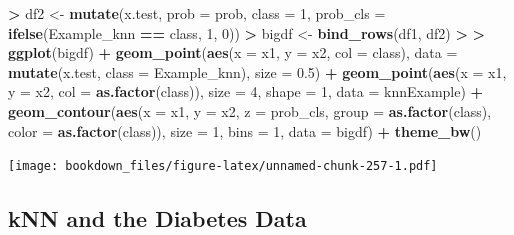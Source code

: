 \documentclass[
]{krantz}
\makeatletter
\newenvironment{Shaded}{\begin{snugshade}}{\end{snugshade}}
\newcommand{\DataTypeTok}[1]{\textcolor[rgb]{0.27,0.27,0.27}{#1}}
\newcommand{\DecValTok}[1]{\textcolor[rgb]{0.06,0.06,0.06}{#1}}
\newcommand{\ErrorTok}[1]{\textcolor[rgb]{0.14,0.14,0.14}{\textbf{#1}}}
\newcommand{\FloatTok}[1]{\textcolor[rgb]{0.06,0.06,0.06}{#1}}
\newcommand{\KeywordTok}[1]{\textcolor[rgb]{0.27,0.27,0.27}{\textbf{#1}}}
\newcommand{\NormalTok}[1]{#1}
\newcommand{\OperatorTok}[1]{\textcolor[rgb]{0.43,0.43,0.43}{\textbf{#1}}}
\newcommand{\StringTok}[1]{\textcolor[rgb]{0.5,0.5,0.5}{#1}}
\newenvironment{kframe}{%
\medskip{}
\setlength{\fboxsep}{.8em}
 \def\at@end@of@kframe{}%
 \ifinner\ifhmode%
  \def\at@end@of@kframe{\end{minipage}}%
  \begin{minipage}{\columnwidth}%
 \fi\fi%
 \def\FrameCommand##1{\hskip\@totalleftmargin \hskip-\fboxsep
 \colorbox{shadecolor}{##1}\hskip-\fboxsep
     \hskip-\linewidth \hskip-\@totalleftmargin \hskip\columnwidth}%
 \MakeFramed {\advance\hsize-\width
   \@totalleftmargin\z@ \linewidth\hsize
   \@setminipage}}%
 {\par\unskip\endMakeFramed%
 \at@end@of@kframe}
\renewenvironment{Shaded}{\begin{kframe}}{\end{kframe}}
\makeatother
\begin{document}
\begin{Shaded}
\begin{Highlighting}[]
\OperatorTok{\textgreater{}}\StringTok{ }\NormalTok{df2 \textless{}{-}}\StringTok{ }\KeywordTok{mutate}\NormalTok{(x.test, }\DataTypeTok{prob =}\NormalTok{ prob, }\DataTypeTok{class =} \DecValTok{1}\NormalTok{,  }\DataTypeTok{prob\_cls =} \KeywordTok{ifelse}\NormalTok{(Example\_knn }\OperatorTok{==}\StringTok{ }\NormalTok{class, }\DecValTok{1}\NormalTok{, }\DecValTok{0}\NormalTok{))}
\OperatorTok{\textgreater{}}\StringTok{ }\NormalTok{bigdf \textless{}{-}}\StringTok{ }\KeywordTok{bind\_rows}\NormalTok{(df1, df2)}
\OperatorTok{\textgreater{}}\StringTok{ }
\ErrorTok{\textgreater{}}\StringTok{ }\KeywordTok{ggplot}\NormalTok{(bigdf) }\OperatorTok{+}\StringTok{ }\KeywordTok{geom\_point}\NormalTok{(}\KeywordTok{aes}\NormalTok{(}\DataTypeTok{x =}\NormalTok{ x1, }\DataTypeTok{y =}\NormalTok{ x2, }\DataTypeTok{col =}\NormalTok{ class), }\DataTypeTok{data =} \KeywordTok{mutate}\NormalTok{(x.test, }\DataTypeTok{class =}\NormalTok{ Example\_knn), }\DataTypeTok{size =} \FloatTok{0.5}\NormalTok{) }\OperatorTok{+}\StringTok{ }\KeywordTok{geom\_point}\NormalTok{(}\KeywordTok{aes}\NormalTok{(}\DataTypeTok{x =}\NormalTok{ x1, }\DataTypeTok{y =}\NormalTok{ x2, }\DataTypeTok{col =} \KeywordTok{as.factor}\NormalTok{(class)), }\DataTypeTok{size =} \DecValTok{4}\NormalTok{, }\DataTypeTok{shape =} \DecValTok{1}\NormalTok{, }\DataTypeTok{data =}\NormalTok{ knnExample) }\OperatorTok{+}\StringTok{ }\KeywordTok{geom\_contour}\NormalTok{(}\KeywordTok{aes}\NormalTok{(}\DataTypeTok{x =}\NormalTok{ x1, }\DataTypeTok{y =}\NormalTok{ x2, }\DataTypeTok{z =}\NormalTok{ prob\_cls, }\DataTypeTok{group =} \KeywordTok{as.factor}\NormalTok{(class), }\DataTypeTok{color =} \KeywordTok{as.factor}\NormalTok{(class)), }\DataTypeTok{size =} \DecValTok{1}\NormalTok{, }\DataTypeTok{bins =} \DecValTok{1}\NormalTok{, }\DataTypeTok{data =}\NormalTok{ bigdf) }\OperatorTok{+}\StringTok{ }\KeywordTok{theme\_bw}\NormalTok{()}
\end{Highlighting}
\end{Shaded}

\texttt{[image: bookdown\_files/figure-latex/unnamed-chunk-257-1.pdf]}

\hypertarget{knn-and-the-diabetes-data}{%
\subsection{kNN and the Diabetes Data}\label{knn-and-the-diabetes-data}}
\end{document}
